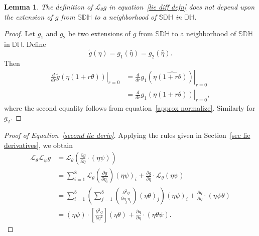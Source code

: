 \documentclass[reqno,12pt]{amsart}
\newcommand\setinvertibledualquat{\mathbb D\mathbb H}
\newcommand\setunitdualquat{\mathbb S\mathbb D\mathbb H}
\newcommand{\liederiv}{\mathcal L}
\newtheorem{lemma}{Lemma}
\begin{document}
\begin{lemma}
\label{not depend}
The definition of $\liederiv_\theta g$ in equation~\eqref{lie diff defn} does not depend upon the extension of $g$ from $\setunitdualquat$ to a neighborhood of $\setunitdualquat$ in $\setinvertibledualquat$.
\end{lemma}

\begin{proof}  Let $g_1$ and $g_2$ be two extensions of $g$ from $\setunitdualquat$ to a neighborhood of $\setunitdualquat$ in $\setinvertibledualquat$.  Define
\begin{equation}
\tilde g(\eta) = g_1(\widehat\eta) = g_2(\widehat\eta).
\end{equation}
Then
\begin{equation}
\begin{aligned}
\left.\frac{d}{d r} \tilde g(\eta(1+r\theta)) \right |_{r = 0}
&=
\left.\frac{d}{d r} g_1(\eta\widehat{(1+r\theta)}) \right |_{r = 0} \\
&=\left.\frac{d}{d r} g_1(\eta(1+r\theta)) \right |_{r = 0},
\end{aligned}
\end{equation}
where the second equality follows from equation~\eqref{approx normalize}.  Similarly for $g_2$.
\end{proof}

\begin{proof}[Proof of Equation~\eqref{second lie deriv}]
Applying the rules given in Section~\ref{sec lie derivatives}, we obtain
\begin{align}
\liederiv_\theta \liederiv_\psi g
&= 
\liederiv_\theta \left( \frac{\partial g}{\partial \eta} \cdot (\eta \psi) \right) \\
&= 
\sum_{i=1}^8 \liederiv_\theta\left(\frac{\partial g}{\partial \eta_i}\right) (\eta \psi)_i +
\frac{\partial g}{\partial \eta} \cdot \liederiv_\theta (\eta \psi) \\
&= 
\sum_{i=1}^8 \left( \sum_{j=1}^8\left(\frac{\partial^2 g}{\partial \eta_j \eta_i}\right)(\eta\theta)_j\right) (\eta \psi)_i +
 \frac{\partial g}{\partial \eta} \cdot (\eta \psi \theta) \\
&= (\eta \psi) \cdot \left[\frac{\partial^2 g}{\partial \eta^2}\right](\eta \theta) + \frac{\partial g}{\partial \eta} \cdot (\eta \theta \psi) .
\end{align}
\end{proof}
\end{document}
